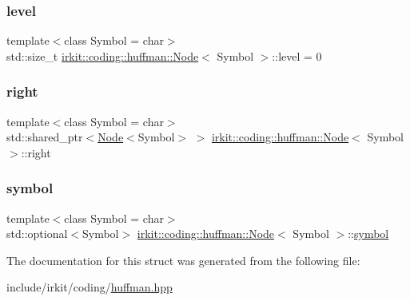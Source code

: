 \mbox{\label{structirkit_1_1coding_1_1huffman_1_1Node_ae358f99d933b40237dad8140f27d1b94}} 
\subsubsection{\texorpdfstring{level}{level}}
{\footnotesize\ttfamily template$<$class Symbol = char$>$ \\
std\+::size\+\_\+t \mbox{\hyperlink{structirkit_1_1coding_1_1huffman_1_1Node}{irkit\+::coding\+::huffman\+::\+Node}}$<$ Symbol $>$\+::level = 0}

\mbox{\label{structirkit_1_1coding_1_1huffman_1_1Node_a37ea988a6ef795cb80851347e886d56f}} 
\subsubsection{\texorpdfstring{right}{right}}
{\footnotesize\ttfamily template$<$class Symbol = char$>$ \\
std\+::shared\+\_\+ptr$<$\mbox{\hyperlink{structirkit_1_1coding_1_1huffman_1_1Node}{Node}}$<$Symbol$>$ $>$ \mbox{\hyperlink{structirkit_1_1coding_1_1huffman_1_1Node}{irkit\+::coding\+::huffman\+::\+Node}}$<$ Symbol $>$\+::right}

\mbox{\label{structirkit_1_1coding_1_1huffman_1_1Node_ae3b48f04c2a693e74e3baaafcf2842f1}} 
\subsubsection{\texorpdfstring{symbol}{symbol}}
{\footnotesize\ttfamily template$<$class Symbol = char$>$ \\
std\+::optional$<$Symbol$>$ \mbox{\hyperlink{structirkit_1_1coding_1_1huffman_1_1Node}{irkit\+::coding\+::huffman\+::\+Node}}$<$ Symbol $>$\+::\mbox{\hyperlink{porter2_8hpp_a04438e24473719aaf288c57833717164}{symbol}}}



The documentation for this struct was generated from the following file\+:\begin{DoxyCompactItemize}
\item 
include/irkit/coding/\mbox{\hyperlink{huffman_8hpp}{huffman.\+hpp}}\end{DoxyCompactItemize}
